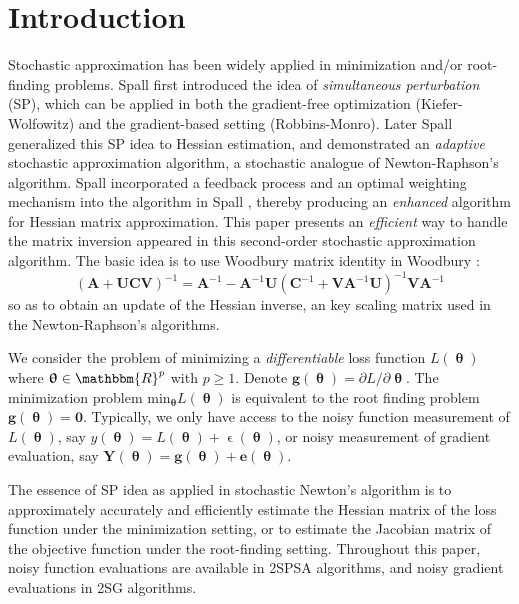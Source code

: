 \documentclass[conference]{IEEEtran}
\begin{document}
\section{Introduction} \label{Introduction}
Stochastic approximation has been widely applied in minimization and/or root-finding problems. Spall \cite{Spall1992} first introduced the idea of \textit{simultaneous perturbation} (SP), which can be applied in both the gradient-free optimization (Kiefer-Wolfowitz) and the gradient-based setting (Robbins-Monro). Later Spall \cite{Spall2000} generalized this SP idea to Hessian estimation, and demonstrated an \textit{adaptive} stochastic approximation algorithm, a stochastic analogue of Newton-Raphson's algorithm. Spall \cite{Spall2009} incorporated a feedback process and an optimal weighting mechanism into the algorithm in Spall \cite{Spall2000}, thereby producing an \textit{enhanced} algorithm for Hessian matrix approximation. This paper presents an \textit{efficient} way to handle the matrix inversion appeared in this second-order stochastic approximation algorithm. The basic idea is to use Woodbury matrix identity in Woodbury \cite{Woodbury1950}:
\begin{equation} \label{eq:MatrixInversion}
(\bm{A}+\bm{UCV})^{-1}=\bm{A}^{-1}-\bm{A}^{-1}\bm{U}(\bm{C}^{-1}+\bm{V}\bm{A}^{-1}\bm{U})^{-1}\bm{V}\bm{A}^{-1}
\end{equation}
so as to obtain an update of the Hessian inverse, an key scaling matrix used in the Newton-Raphson's algorithms. 

We consider the problem of minimizing a \textit{differentiable} loss function $ L(\bm{\uptheta}) $ where $ \bm{\uptheta} \in \mathbbm{R}^p $ with $ p\ge1 $. Denote $\bm{g}(\bm{\uptheta})={\partial L}/{\partial \bm{\uptheta}}$. The minimization problem ${\text{min}}_{\bm{\uptheta}}L(\bm{\uptheta})$ is equivalent to the root finding problem $\bm{g}(\bm{\uptheta})=\bm{0}$.  Typically, we only have access to the noisy function measurement of $ L(\bm{\uptheta}) $, say $ y(\bm{\uptheta})=L(\bm{\uptheta})+\upvarepsilon(\bm{\uptheta}) $, or noisy measurement of gradient evaluation, say $\bm{Y}(\bm{\uptheta})=\bm{g}(\bm{\uptheta})+\bm{e}(\bm{\uptheta})$.

The essence of SP idea as applied in stochastic Newton's algorithm is to approximately accurately and efficiently estimate the Hessian matrix of the loss function under the minimization setting, or to estimate the Jacobian matrix of the objective function under the root-finding setting. Throughout this paper, noisy function evaluations are available in 2SPSA algorithms, and noisy gradient evaluations in 2SG algorithms. 
 
\end{document}
